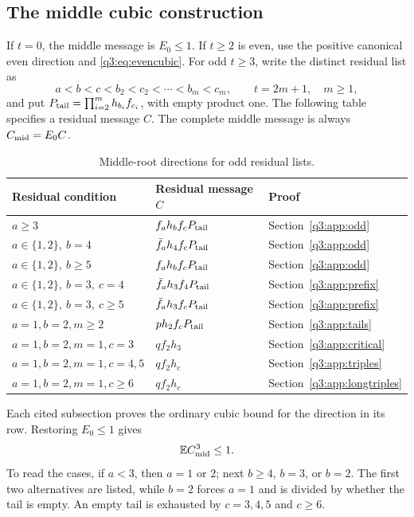 \subsection{The middle cubic construction}
If $t=0$, the middle message is $E_0\le1$. If $t\ge2$ is even, use the positive canonical even direction and \eqref{q3:eq:evencubic}. For odd $t\ge3$, write the distinct residual list as
\[
 a<b<c<b_2<c_2<\cdots<b_m<c_m,\qquad t=2m+1,\quad m\ge1,
\]
and put $P_{\rm tail}=\prod_{i=2}^m h_{b_i}f_{c_i}$, with empty product one. The following table specifies a residual message $C$. The complete middle message is always $C_{\rm mid}=E_0C$.

\begin{table}[htbp]
\centering
\caption{Middle-root directions for odd residual lists.}\label{tab:middle}
\fontsize{9}{11}\selectfont
\noindent\begin{tabular}{@{}p{65mm}p{45mm}p{25mm}@{}}
\toprule
Residual condition & Residual message $C$ & Proof\\\midrule
$a\ge3$ & $f_ah_bf_cP_{\rm tail}$ & Section~\ref{q3:app:odd}\\
$a\in\{1,2\},\ b=4$ & $\bar f_ah_4f_cP_{\rm tail}$ & Section~\ref{q3:app:odd}\\
$a\in\{1,2\},\ b\ge5$ & $f_ah_bf_cP_{\rm tail}$ & Section~\ref{q3:app:odd}\\
$a\in\{1,2\},\ b=3,\ c=4$ & $\bar f_ah_3f_4P_{\rm tail}$ & Section~\ref{q3:app:prefix}\\
$a\in\{1,2\},\ b=3,\ c\ge5$ & $\bar f_ah_3f_cP_{\rm tail}$ & Section~\ref{q3:app:prefix}\\
$a=1,b=2,m\ge2$ & $p h_2f_cP_{\rm tail}$ & Section~\ref{q3:app:tails}\\
$a=1,b=2,m=1,c=3$ & $qf_2h_3$ & Section~\ref{q3:app:critical}\\
$a=1,b=2,m=1,c=4,5$ & $qf_2h_c$ & Section~\ref{q3:app:triples}\\
$a=1,b=2,m=1,c\ge6$ & $qf_2h_c$ & Section~\ref{q3:app:longtriples}\\
\bottomrule
\end{tabular}
\end{table}

Each cited subsection proves the ordinary cubic bound for the direction in its row. Restoring $E_0\le1$ gives
\begin{equation}\label{q3:eq:middlecubic}
 \mathbb E C_{\rm mid}^3\le1.
\end{equation}
To read the cases, if $a<3$, then $a=1$ or $2$; next $b\ge4$, $b=3$, or $b=2$. The first two alternatives are listed, while $b=2$ forces $a=1$ and is divided by whether the tail is empty. An empty tail is exhausted by $c=3,4,5$ and $c\ge6$.

